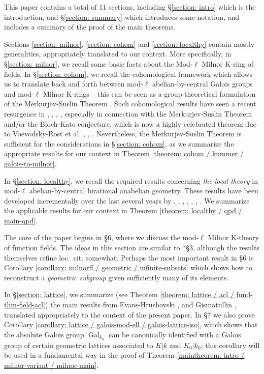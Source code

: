\documentclass[11pt]{amsart}
\theoremstyle{definition}
\theoremstyle{remark}
\numberwithin{equation}{section}
\DeclareMathOperator{\Gal}{Gal}
\newcommand{\Galk}{{\Gal_{k_0}}}
\begin{document}
This paper contains a total of 11 sections, including \S\ref{section: intro} which is the introduction, and \S\ref{section: summary} which introduces some notation, and includes a summary of the proof of the main theorems.

Sections \ref{section: milnor}, \ref{section: cohom} and \ref{section: localthy} contain mostly generalities, appropriately translated to our context.
More specifically, in \S\ref{section: milnor}, we recall some basic facts about the Mod-$\ell$ Milnor K-ring of fields.
In \S\ref{section: cohom}, we recall the cohomological framework which allows us to translate back and forth between mod-$\ell$ abelian-by-central Galois groups and mod-$\ell$ Milnor K-rings -- this can be seen as a group-theoretical formulation of the Merkurjev-Suslin Theorem \cite{Merkurjev:1982}.
Such cohomological results have seen a recent resurgence in \cite{Chebolu:2012}, \cite{Efrat:2011}, \cite{Efrat:2015}, \cite{Topaz:2015b}, especially in connection with the Merkurjev-Suslin Theorem \cite{Merkurjev:1982} and/or the Bloch-Kato conjecture, which is now a highly-celebrated theorem due to {\sc Voevodsky-Rost} et al. \cite{Voevodsky:2011}, \cite{Rost:1998}, \cite{Weibel:2009}.
Nevertheless, the Merkurjev-Suslin Theorem is sufficient for the considerations in \S\ref{section: cohom}, as we summarize the appropriate results for our context in Theorem \ref{theorem: cohom / kummer / galois-to-milnor}.

In \S\ref{section: localthy}, we recall the required results concerning \emph{the local theory} in mod-$\ell$ abelian-by-central birational anabelian geometry.
These results have been developed incrementally over the last several years by \cite{Bogomolov:2002}, \cite{Mahe:2004}, \cite{Pop:2010}, \cite{Pop:2010a}, \cite{Efrat:2012}, \cite{Topaz:2013a}, \cite{Topaz:2015}.
We summarize the applicable results for our context in Theorem \ref{theorem: localthy / qpd / main-qpd}.

The core of the paper begins in \S6, where we discuss the mod-$\ell$ Milnor K-theory of function fields.
The ideas in this section are similar to \cite{Topaz:2014}*{\S3}, although the results themselves refine loc.~cit. somewhat.
Perhaps the most important result in \S6 is Corollary \ref{corollary: milnorff / geometric / infinite-subsets} which shows how to reconstruct a \emph{geometric subgroup} given sufficiently many of its elements.

In \S\ref{section: lattice}, we summarize (see Theorem \ref{theorem: lattice / acl / fund-thm-field-acl}) the main results from {\sc Evans-Hrushovski} \cite{Evans:1991}, \cite{Evans:1995} and {\sc Gismatullin} \cite{Gismatullin:2008}, translated appropriately to the context of the present paper.
In \S7 we also prove Corollary \ref{corollary: lattice / galois-mod-ell / galois-lattice-iso}, which shows that the absolute Galois group $\Galk$ can be canonically identified with a Galois group of certain geometric lattices associated to $K|k$ and $K_0|k_0$; this corollary will be used in a fundamental way in the proof of Theorem \ref{maintheorem: intro / milnor-variant / milnor-main}.
\end{document}
